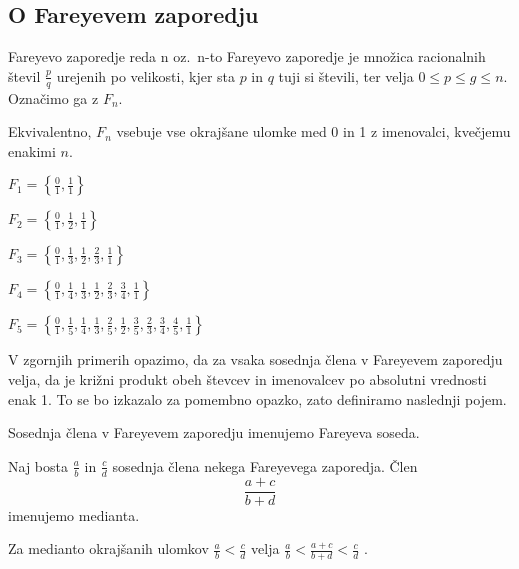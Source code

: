 \documentclass[mat1]{fmfdelo}
\begin{document}
\subsection{O Fareyevem zaporedju}

\begin{definicija}
Fareyevo zaporedje reda n oz.\ n-to Fareyevo zaporedje je množica racionalnih števil $\frac{p}{q}$ urejenih po velikosti, kjer sta $p$ in $q$ tuji si števili, ter velja $0 \leq p \leq g \leq n$. Označimo ga z $F_n$.

Ekvivalentno, $F_n$ vsebuje vse okrajšane ulomke med 0 in 1 z imenovalci, kvečjemu enakimi $n$.
\end{definicija}

\begin{primer}
\(F_1 = \left \{\frac{0}{1}, \frac{1}{1} \right \} \)

\(F_2 = \left \{\frac{0}{1}, \frac{1}{2}, \frac{1}{1} \right \} \)

\(F_3 = \left \{\frac{0}{1}, \frac{1}{3}, \frac{1}{2}, \frac{2}{3}, \frac{1}{1} \right \} \)

\(F_4 = \left \{\frac{0}{1}, \frac{1}{4}, \frac{1}{3}, \frac{1}{2}, \frac{2}{3}, \frac{3}{4}, \frac{1}{1} \right \} \)

\(F_5 = \left \{\frac{0}{1}, \frac{1}{5}, \frac{1}{4}, \frac{1}{3}, \frac{2}{5}, \frac{1}{2}, \frac{3}{5}, \frac{2}{3}, \frac{3}{4}, \frac{4}{5}, \frac{1}{1}\right \} \)
\end{primer}

V zgornjih primerih opazimo, da za vsaka sosednja člena v Fareyevem zaporedju velja, da je križni produkt obeh števcev in imenovalcev po absolutni vrednosti enak 1.  To se bo izkazalo za pomembno opazko, zato definiramo naslednji pojem.

\begin{definicija}
Sosednja člena v Fareyevem zaporedju imenujemo Fareyeva soseda.
\end{definicija}

\begin{definicija}
Naj bosta $\frac{a}{b}$ in $\frac{c}{d}$ sosednja člena nekega Fareyevega zaporedja. Člen \[\frac{a+c}{b+d} \] imenujemo medianta.
\end{definicija}

\begin{trditev}
Za medianto okrajšanih ulomkov \(\frac{a}{b} < \frac{c}{d}\) velja  \(\frac{a}{b} < \frac{a+c}{b+d} < \frac{c}{d}\) .
\end{trditev}
\end{document}
